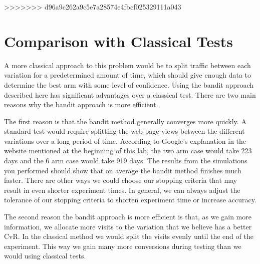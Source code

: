 >>>>>>> d96a9c262a9c5e7a28574e4fbcf025329111a043

\section*{Comparison with Classical Tests}
A more classical approach to this problem would be to split traffic between each 
variation for a predetermined amount of time, which should give enough data to 
determine the best arm with some level of confidence.  
Using the bandit approach described here has significant advantages over a classical test.  
There are two main reasons why the bandit approach is more efficient.

The first reason is that the bandit method generally converges more quickly.  
A standard test would require splitting the web page views between the different 
variations over a long period of time.  According to Google's explanation in the 
website mentioned at the beginning of this lab, the two arm case would take 223 days 
and the 6 arm case would take 919 days.  The results from the simulations you performed
should show that on average the bandit method finishes much faster.  
There are other ways we could choose our stopping criteria that may result in even shorter experiment times.
In general, we can always adjust the tolerance of our stopping criteria to shorten experiment time or increase accuracy.

The second reason the bandit approach is more efficient is that, as we gain more information,
we allocate more visits to the variation that we believe has a better CvR.
In the classical method we would split the visits evenly until the end of the experiment.
This way we gain many more conversions during testing than we would using classical tests.
